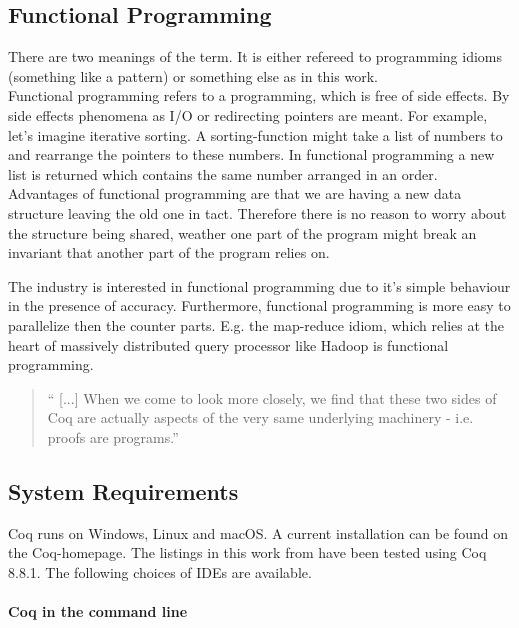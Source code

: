 \subsection{Functional Programming}

There are two meanings of the term. 
It is either refereed to programming idioms (something like a pattern) or something else as in this work.\\

Functional programming refers to a programming, which is free of side effects.
By side effects phenomena as I/O or redirecting pointers are meant. 
For example, let's imagine iterative sorting. 
A sorting-function might take a list of numbers to and rearrange the pointers to these numbers.
In functional programming a new list is returned which contains the same number arranged in an order.\\ 
Advantages of functional programming are  that we are having a new data structure leaving the old one in tact. 
Therefore there is no reason to worry about the structure being shared, weather one part of the program might break an invariant that another part of the program relies on.\par
The industry is interested in functional programming due to it's simple behaviour in the presence of accuracy.
Furthermore, functional programming is more easy to parallelize then the counter parts.
E.g. the map-reduce idiom, which relies at the heart of massively distributed query processor like \gls{Hadoop} is functional programming. 

\begin{quote}
`` [...] When we come to look more closely, we find that these two sides of Coq are actually aspects of the very same underlying machinery - i.e. proofs are programs.'' 
\end{quote}




\subsection{System Requirements}

Coq runs on Windows, Linux and macOS.
A current installation can be found on the Coq-homepage. 
The listings in this work from \cite{PACGGHSY} have been tested using Coq 8.8.1.
The following choices of IDEs are available. 


\paragraph{Coq in the command line}

